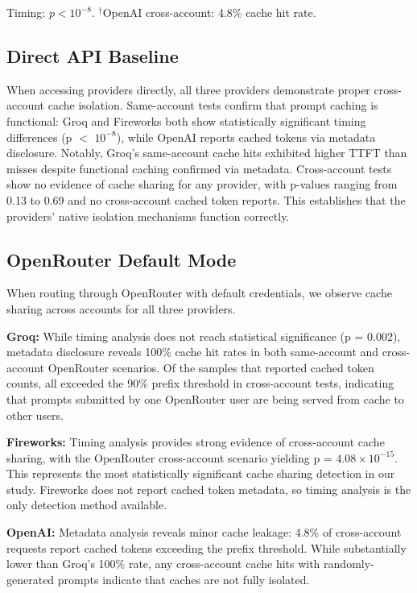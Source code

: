 \documentclass[conference]{IEEEtran}
\begin{document}
\begin{table}[htbp]
    \vspace{0.3em}
    \footnotesize
    Timing: $p<10^{-8}$. $^\dagger$OpenAI cross-account: 4.8\% cache hit rate.
\end{table}

\FloatBarrier

\subsection{Direct API Baseline}

When accessing providers directly, all three providers demonstrate proper cross-account cache isolation.
Same-account tests confirm that prompt caching is functional: Groq and Fireworks both show statistically significant timing differences (p $<$ $10^{-8}$), while OpenAI reports cached tokens via metadata disclosure.
Notably, Groq's same-account cache hits exhibited higher TTFT than misses despite functional caching confirmed via metadata.
Cross-account tests show no evidence of cache sharing for any provider, with p-values ranging from 0.13 to 0.69 and no cross-account cached token reports.
This establishes that the providers' native isolation mechanisms function correctly.

\subsection{OpenRouter Default Mode}

When routing through OpenRouter with default credentials, we observe cache sharing across accounts for all three providers.

\textbf{Groq:} While timing analysis does not reach statistical significance (p = 0.002), metadata disclosure reveals 100\% cache hit rates in both same-account and cross-account OpenRouter scenarios.
Of the samples that reported cached token counts, all exceeded the 90\% prefix threshold in cross-account tests, indicating that prompts submitted by one OpenRouter user are being served from cache to other users.

\textbf{Fireworks:} Timing analysis provides strong evidence of cross-account cache sharing, with the OpenRouter cross-account scenario yielding p = $4.08 \times 10^{-15}$.
This represents the most statistically significant cache sharing detection in our study.
Fireworks does not report cached token metadata, so timing analysis is the only detection method available.

\textbf{OpenAI:} Metadata analysis reveals minor cache leakage: 4.8\% of cross-account requests report cached tokens exceeding the prefix threshold.
While substantially lower than Groq's 100\% rate, any cross-account cache hits with randomly-generated prompts indicate that caches are not fully isolated.
\end{document}
